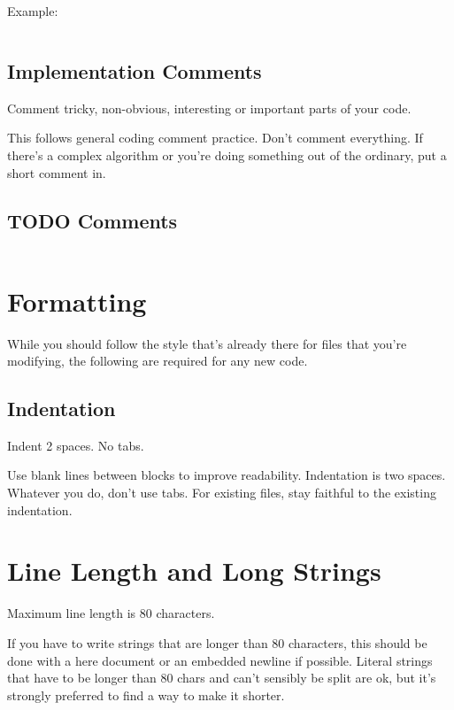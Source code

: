 \documentclass{article}
\begin{document}
Example:

\inputminted[frame=single,firstline=14, lastline=48,linenos]{bash}{./styleguide.bash}

\subsection{Implementation Comments}
\label{subsec:Imp_comms}
Comment tricky, non-obvious, interesting or important parts of your code.

This follows general coding comment practice. Don’t comment everything. If there’s a complex algorithm or you’re doing something out of the ordinary, put a short comment in.

\subsection{TODO Comments}
\label{subsec:todo_comms}
\inputminted[frame=single,firstline=50, lastline=50,linenos]{bash}{./styleguide.bash}

\section{Formatting}
\label{sec:Form}
While you should follow the style that’s already there for files that you’re modifying, the following are required for any new code.

\subsection{Indentation}
\label{subsec:Indent}
Indent 2 spaces. No tabs.

Use blank lines between blocks to improve readability. Indentation is two spaces. Whatever you do, don’t use tabs. For existing files, stay faithful to the existing indentation.

\section{Line Length and Long Strings}
\label{subsec:Line_Len}
Maximum line length is 80 characters.

If you have to write strings that are longer than 80 characters, this should be done with a here document or an embedded newline if possible. Literal strings that have to be longer than 80 chars and can’t sensibly be split are ok, but it’s strongly preferred to find a way to make it shorter.
\inputminted[frame=single,firstline=52, lastline=60,linenos]{bash}{./styleguide.bash}
\end{document}
